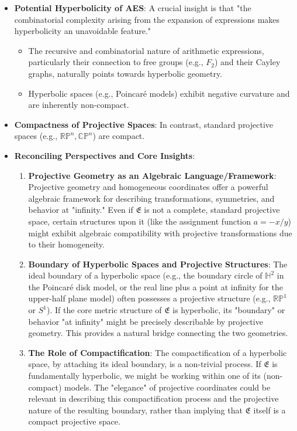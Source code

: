 \documentclass{article}
\begin{document}
\begin{itemize}
    \item \textbf{Potential Hyperbolicity of AES}: A crucial insight is that "the combinatorial complexity arising from the expansion of expressions makes hyperbolicity an unavoidable feature."
    \begin{itemize}
        \item The recursive and combinatorial nature of arithmetic expressions, particularly their connection to free groups (e.g., $F_2$) and their Cayley graphs, naturally points towards hyperbolic geometry.
        \item Hyperbolic spaces (e.g., Poincaré models) exhibit negative curvature and are inherently non-compact.
    \end{itemize}
    \item \textbf{Compactness of Projective Spaces}: In contrast, standard projective spaces (e.g., $\mathbb{RP}^n, \mathbb{CP}^n$) are compact.
    \item \textbf{Reconciling Perspectives and Core Insights}:
    \begin{enumerate}
        \item \textbf{Projective Geometry as an Algebraic Language/Framework}: Projective geometry and homogeneous coordinates offer a powerful algebraic framework for describing transformations, symmetries, and behavior at "infinity." Even if $\mathfrak{E}$ is not a complete, standard projective space, certain structures upon it (like the assignment function $a=-x/y$) might exhibit algebraic compatibility with projective transformations due to their homogeneity.
        \item \textbf{Boundary of Hyperbolic Spaces and Projective Structures}: The ideal boundary of a hyperbolic space (e.g., the boundary circle of $\mathbb{H}^2$ in the Poincaré disk model, or the real line plus a point at infinity for the upper-half plane model) often possesses a projective structure (e.g., $\mathbb{RP}^1$ or $S^1$). If the core metric structure of $\mathfrak{E}$ is hyperbolic, its "boundary" or behavior "at infinity" might be precisely describable by projective geometry. This provides a natural bridge connecting the two geometries.
        \item \textbf{The Role of Compactification}: The compactification of a hyperbolic space, by attaching its ideal boundary, is a non-trivial process. If $\mathfrak{E}$ is fundamentally hyperbolic, we might be working within one of its (non-compact) models. The "elegance" of projective coordinates could be relevant in describing this compactification process and the projective nature of the resulting boundary, rather than implying that $\mathfrak{E}$ itself is a compact projective space.

\end{enumerate}
\end{itemize}
\end{document}
